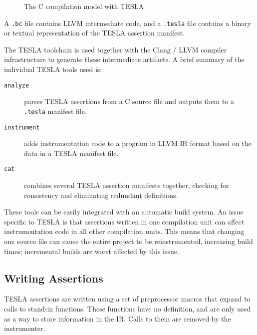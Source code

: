 {\begin{figure}[h]
{
  }
  \caption{The C compilation model with TESLA}
  \label{fig:c-tesla-compilation}
\end{figure}
}

A \texttt{.bc} file contains LLVM intermediate code, and a \texttt{.tesla} file
contains a binary or textual representation of the TESLA assertion manifest.

The TESLA toolchain is used together with the Clang / LLVM compiler
infrastructure to generate these intermediate artifacts. A brief summary of the
individual TESLA tools used is:

\begin{description}
  \item[\texttt{analyze}] parses TESLA assertions from a C source file and
    outputs them to a \texttt{.tesla} manifest file.
  \item[\texttt{instrument}] adds instrumentation code to a program in LLVM IR
    format based on the data in a TESLA manifest file.
  \item[\texttt{cat}] combines several TESLA assertion manifests together,
    checking for consistency and eliminating redundant definitions.
\end{description}

These tools can be easily integrated with an automatic build system. An issue
specific to TESLA is that assertions written in one compilation unit can affect
instrumentation code in all other compilation units. This means that changing
one source file can cause the entire project to be reinstrumented, increasing
build times; incremental builds are worst affected by this issue.

\subsection{Writing Assertions}

TESLA assertions are written using a set of preprocessor macros that expand to
calls to stand-in functions. These functions have no definition, and are only
used as a way to store information in the IR. Calls to them are removed by the
instrumenter.

